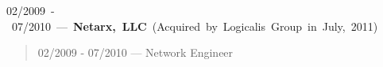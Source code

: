 \mbox{02/2009 - 07/2010 --- {\bf Netarx, LLC} (Acquired by Logicalis Group in July, 2011)}
\begin{quote}
02/2009 - 07/2010 --- Network Engineer\\
\end{quote}
